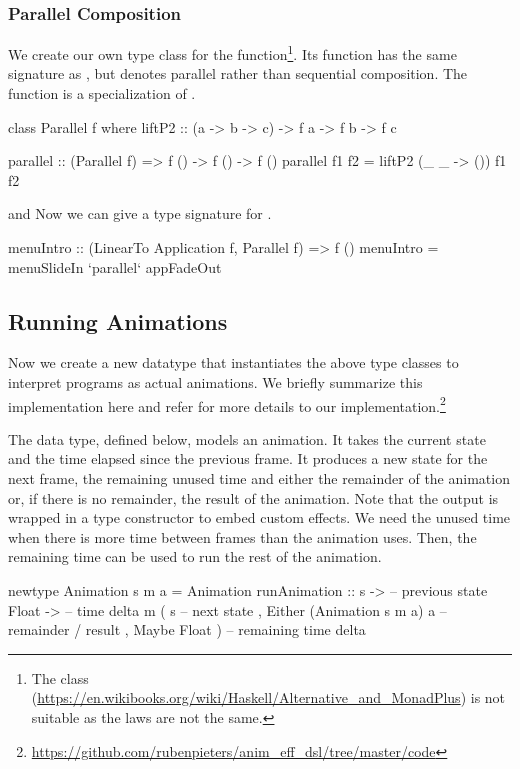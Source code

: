 \subsubsection{Parallel Composition}

We create our own  type class for the  function\footnote{The  class (\url{https://en.wikibooks.org/wiki/Haskell/Alternative_and_MonadPlus}) is not suitable as the laws are not the same.}. Its  function has the same signature as , but denotes parallel rather than sequential composition. The  function is a specialization of .

\begin{code}
class Parallel f where
  liftP2 :: (a -> b -> c) -> f a -> f b -> f c

parallel :: (Parallel f) => f () -> f () -> f ()
parallel f1 f2 = liftP2 (\_ _ -> ()) f1 f2
\end{code}
 and
Now we can give a type signature for .
\begin{code}
menuIntro :: (LinearTo Application f, Parallel f) => f ()
menuIntro = menuSlideIn `parallel` appFadeOut
\end{code}

\subsection{Running Animations}

Now we create a new  datatype that instantiates the above
type classes to interpret \dsl{} programs as actual animations. We briefly
summarize this implementation here and refer for more details to
our implementation.\footnote{\url{https://github.com/rubenpieters/anim_eff_dsl/tree/master/code}}

The  data type, defined below, models an animation.
It takes the current state  and the
time elapsed since the previous frame. It produces a new
state for the next frame, the remaining unused time and either the remainder of the animation or, if there is no remainder, the result of the animation. Note that the output is wrapped in a type
constructor  to embed custom effects. 
We need the unused time when there is more time between frames than the animation
uses.
Then, the remaining time
can be used to run the rest of the animation.

\begin{code}
newtype Animation s m a = Animation { runAnimation ::
    s ->                             -- previous state
    Float ->                         -- time delta
    m ( s                            -- next state
      , Either (Animation s m a) a   -- remainder / result
      , Maybe Float )}               -- remaining time delta
\end{code}

